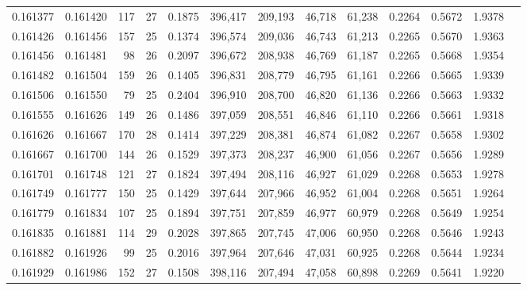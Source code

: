 \begin{tabular}{rrrrrrrrrrrrr}
0.161377 & 0.161420 & 117 &  27 &                                     0.1875 & 396,417 & 209,193 &  46,718 &  61,238 & 0.2264 & 0.5672 & 1.9378 \\
0.161426 & 0.161456 & 157 &  25 &                                     0.1374 & 396,574 & 209,036 &  46,743 &  61,213 & 0.2265 & 0.5670 & 1.9363 \\
0.161456 & 0.161481 &  98 &  26 &                                     0.2097 & 396,672 & 208,938 &  46,769 &  61,187 & 0.2265 & 0.5668 & 1.9354 \\
0.161482 & 0.161504 & 159 &  26 &                                     0.1405 & 396,831 & 208,779 &  46,795 &  61,161 & 0.2266 & 0.5665 & 1.9339 \\
0.161506 & 0.161550 &  79 &  25 &                                     0.2404 & 396,910 & 208,700 &  46,820 &  61,136 & 0.2266 & 0.5663 & 1.9332 \\
0.161555 & 0.161626 & 149 &  26 &                                     0.1486 & 397,059 & 208,551 &  46,846 &  61,110 & 0.2266 & 0.5661 & 1.9318 \\
0.161626 & 0.161667 & 170 &  28 &                                     0.1414 & 397,229 & 208,381 &  46,874 &  61,082 & 0.2267 & 0.5658 & 1.9302 \\
0.161667 & 0.161700 & 144 &  26 &                                     0.1529 & 397,373 & 208,237 &  46,900 &  61,056 & 0.2267 & 0.5656 & 1.9289 \\
0.161701 & 0.161748 & 121 &  27 &                                     0.1824 & 397,494 & 208,116 &  46,927 &  61,029 & 0.2268 & 0.5653 & 1.9278 \\
0.161749 & 0.161777 & 150 &  25 &                                     0.1429 & 397,644 & 207,966 &  46,952 &  61,004 & 0.2268 & 0.5651 & 1.9264 \\
0.161779 & 0.161834 & 107 &  25 &                                     0.1894 & 397,751 & 207,859 &  46,977 &  60,979 & 0.2268 & 0.5649 & 1.9254 \\
0.161835 & 0.161881 & 114 &  29 &                                     0.2028 & 397,865 & 207,745 &  47,006 &  60,950 & 0.2268 & 0.5646 & 1.9243 \\
0.161882 & 0.161926 &  99 &  25 &                                     0.2016 & 397,964 & 207,646 &  47,031 &  60,925 & 0.2268 & 0.5644 & 1.9234 \\
0.161929 & 0.161986 & 152 &  27 &                                     0.1508 & 398,116 & 207,494 &  47,058 &  60,898 & 0.2269 & 0.5641 & 1.9220 \\

\end{tabular}
